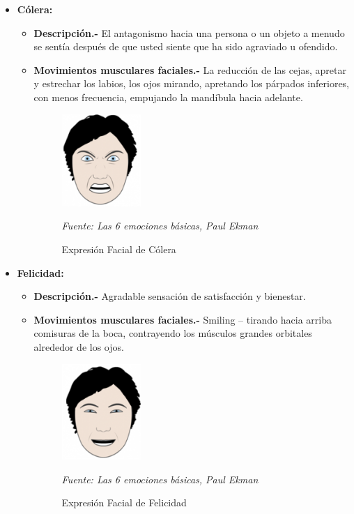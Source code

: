 \begin{itemize}
\item {\textbf{Cólera:} 
\begin{itemize}
\item \textbf{Descripción.-} El antagonismo hacia una persona o un objeto a menudo se sentía después de que usted siente que ha sido agraviado u ofendido.
\item { \textbf{Movimientos musculares faciales.-} La reducción de las cejas, apretar y estrechar los labios, los ojos mirando, apretando los párpados inferiores, con menos frecuencia, empujando la mandíbula hacia adelante.

\begin{figure}[H]
		\centering
		\includegraphics[width=30mm]{./Imagenes/colera.png}
		\caption{Expresión Facial de Cólera}
		\vspace{0.15cm}
		\textit{Fuente: Las 6 emociones básicas, Paul Ekman}
		\label{fig:colera}
\end{figure}}
\end{itemize}}



\item {\textbf{Felicidad:} 
\begin{itemize}
\item \textbf{Descripción.-} Agradable sensación de satisfacción y bienestar.
\item { \textbf{Movimientos musculares faciales.-} Smiling – tirando hacia arriba comisuras de la boca, contrayendo los músculos grandes orbitales alrededor de los ojos.

\begin{figure}[H]
		\centering
		\includegraphics[width=30mm]{./Imagenes/felicidad.png}
		\caption{Expresión Facial de Felicidad}
		\vspace{0.15cm}
		\textit{Fuente: Las 6 emociones básicas, Paul Ekman}
		\label{fig:felicidad}
\end{figure}}
\end{itemize}}




\end{itemize}
